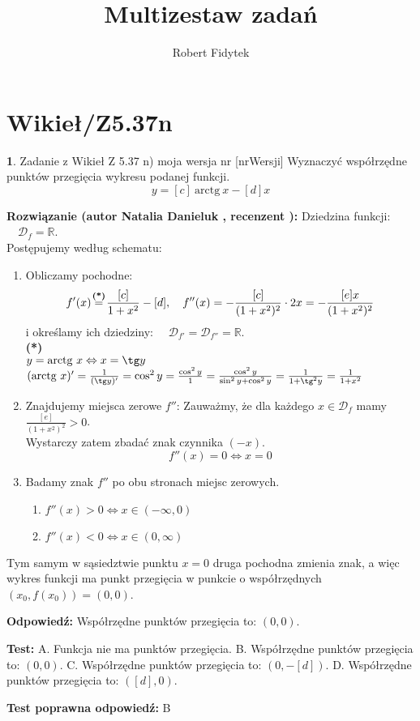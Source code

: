 \documentclass[12pt, a4paper]{article}
\title{Multizestaw zadań}
\author{Robert Fidytek}
\date{}
\theoremstyle{definition} %
\newtheorem{zad}{}
\newcommand{\kategoria}[1]{\section{#1}} %
\newcommand{\zadStart}[1]{\begin{zad}#1\newline} %
\newcommand{\zadStop}{\end{zad}}   %
\newcommand{\rozwStart}[2]{\noindent \textbf{Rozwiązanie (autor #1 , recenzent #2): }\newline} %
\newcommand{\rozwStop}{\newline}                                            %
\newcommand{\odpStart}{\noindent \textbf{Odpowiedź:}\newline}    %
\newcommand{\odpStop}{\newline}                                             %
\newcommand{\testStart}{\noindent \textbf{Test:}\newline} %
\newcommand{\testStop}{\newline} %
\newcommand{\kluczStart}{\noindent \textbf{Test poprawna odpowiedź:}\newline} %
\newcommand{\kluczStop}{\newline} %
\begin{document}
\maketitle

\kategoria{Wikieł/Z5.37n}

\zadStart{Zadanie z Wikieł Z 5.37 n) moja wersja nr [nrWersji]}
Wyznaczyć współrzędne punktów przegięcia wykresu podanej funkcji.
$$y = [c]\ \text{arctg}\ x - [d]x$$
\zadStop

\rozwStart{Natalia Danieluk}{}
Dziedzina funkcji: $\quad \mathcal{D}_f=\mathbb{R}$. \\
Postępujemy według schematu:
\begin{enumerate}
\item Obliczamy pochodne: 
$$f'(x) \mathrel{\stackrel{\makebox[0pt]{\mbox{\normalfont\scriptsize\textbf{(*)}}}}{=}} \frac{[c]}{1+x^2} - [d],
\quad f''(x) = - \frac{[c]}{(1+x^2)^2} \cdot 2x = - \frac{[e]x}{(1+x^2)^2}$$
i określamy ich dziedziny: $\quad \mathcal{D}_{f'}=\mathcal{D}_{f''}=\mathbb{R}$. \\
{\normalfont\scriptsize\textbf{(*)}\\
$y = \text{arctg}\ x \Leftrightarrow x = \tg y$\\
$(\text{arctg}\ x)' = \frac{1}{(\tg y)'} = \cos^2y = \frac{\cos^2y}{1} = \frac{\cos^2y}{\sin^2y + \cos^2y} = \frac{1}{1 + \tg^2y}= \frac{1}{1 + x^2}$}\\
\item Znajdujemy miejsca zerowe $f''$: 
Zauważmy, że dla każdego $x \in \mathcal{D}_f$ mamy $\frac{[e]}{(1+x^2)^2} > 0$. \\
Wystarczy zatem zbadać znak czynnika $(-x)$. \\
$$f''(x)=0 \Leftrightarrow x=0$$
\item Badamy znak $f''$ po obu stronach miejsc zerowych. \\
	\begin{enumerate}
	\item $f''(x) > 0 \Leftrightarrow x \in (-\infty,0)$\\
	\item $f''(x) < 0 \Leftrightarrow x \in (0,\infty)$
	\end{enumerate}
\end{enumerate}
Tym samym w sąsiedztwie punktu $x=0$ druga pochodna zmienia znak, a więc wykres funkcji ma punkt przegięcia w punkcie o współrzędnych $(x_0,f(x_0)) = (0,0)$.
\rozwStop

\odpStart
Współrzędne punktów przegięcia to: $(0,0)$.
\odpStop

\testStart
A. Funkcja nie ma punktów przegięcia.
B. Współrzędne punktów przegięcia to: $(0,0)$.
C. Współrzędne punktów przegięcia to: $(0,-[d])$.
D. Współrzędne punktów przegięcia to: $([d],0)$.
\testStop

\kluczStart
B
\kluczStop
\end{document}

